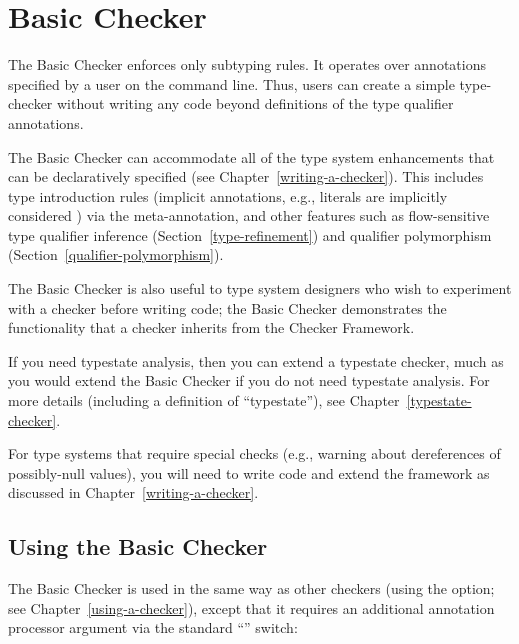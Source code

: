 \htmlhr
\chapter{Basic Checker\label{basic-checker}}

The Basic Checker enforces only subtyping rules.  It operates over
annotations specified by a user on the command line.  Thus, users can
create a simple type-checker without writing any code beyond definitions of
the type qualifier annotations.

The Basic Checker can accommodate all of the type system enhancements that
can be declaratively specified (see Chapter~\ref{writing-a-checker}).
This includes type introduction rules (implicit
annotations, e.g., literals are implicitly considered ) via
the  meta-annotation, and other features such as
flow-sensitive type qualifier inference (Section~\ref{type-refinement}) and
qualifier polymorphism (Section~\ref{qualifier-polymorphism}).

The Basic Checker is also useful to type system designers who wish to
experiment with a checker before writing code; the Basic Checker
demonstrates the functionality that a checker inherits from the Checker
Framework.

If you need typestate analysis, then you can extend a typestate checker,
much as you would extend the Basic Checker if you do not need typestate
analysis.  For more details (including a definition of ``typestate''), see
Chapter~\ref{typestate-checker}.

For type systems that require special checks (e.g., warning about
dereferences of possibly-null values), you will need to write code and
extend the framework as discussed in Chapter~\ref{writing-a-checker}.


\section{Using the Basic Checker\label{basic-using}}

The Basic Checker is used in the same way as other checkers (using the
 option; see Chapter~\ref{using-a-checker}), except that it
requires an additional annotation processor argument via the standard
``'' switch:

